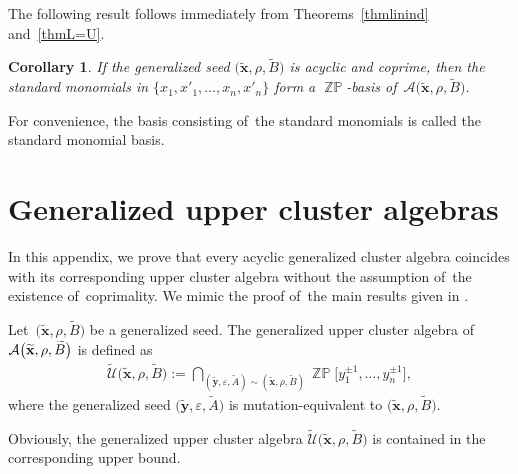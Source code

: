 \documentclass[pdftex]{sigma}
\numberwithin{equation}{section}
\newtheorem{Corollary}[Theorem]{Corollary}
\begin{document}
The following result follows immediately from Theorems~\ref{thmlinind} and~\ref{thmL=U}.
\begin{Corollary}
If the generalized seed $\big(\widetilde{\mathbf{x}},\rho,\widetilde{B}\big)$ is acyclic and coprime, then the standard monomials in $\{x_1,x'_1,\ldots,x_n,x'_n\}$ form a $\mathop{\mathbb{ZP}}$-basis of~$\mathcal{A}\big(\widetilde{\mathbf{x}},\rho,\widetilde{B}\big)$.
\end{Corollary}

For convenience, the basis consisting of~the standard monomials is called the standard monomial basis.


\appendix
\section{Generalized upper cluster algebras}\label{appendix}

In this appendix, we prove that every acyclic generalized cluster algebra coincides with its corresponding upper cluster algebra without the assumption of~the existence of~coprimality. We mimic the proof of~the main results given in \cite{muller14}.

\begin{Definition}
Let~$\big(\widetilde{\mathbf{x}},\rho,\widetilde{B}\big)$ be a generalized seed. The generalized upper cluster algebra of~$\mathcal{A}\smash{\big(\widetilde{\mathbf{x}},\rho,\widetilde{B}\big)}$ is defined as
\begin{gather*}
\widetilde{\mathcal{U}}\big(\widetilde{\mathbf{x}},\rho,\widetilde{B}\big):= \bigcap\limits_{\left(\widetilde{\mathbf{y}},\varepsilon,\widetilde{A}\right)\sim \left(\widetilde{\mathbf{x}},\rho,\widetilde{B}\right)} \mathop{\mathbb{ZP}}\!\big[y^{\pm1}_1,\ldots,y^{\pm1}_n\big],
\end{gather*}
where the generalized seed $\big(\widetilde{\mathbf{y}},\varepsilon,\widetilde{A}\big)$ is mutation-equivalent to $\big(\widetilde{\mathbf{x}},\rho,\widetilde{B}\big)$.

\end{Definition}
Obviously, the generalized upper cluster algebra $\widetilde{\mathcal{U}}\big(\widetilde{\mathbf{x}},\rho,\widetilde{B}\big)$ is contained in the corresponding upper bound.
\end{document}

